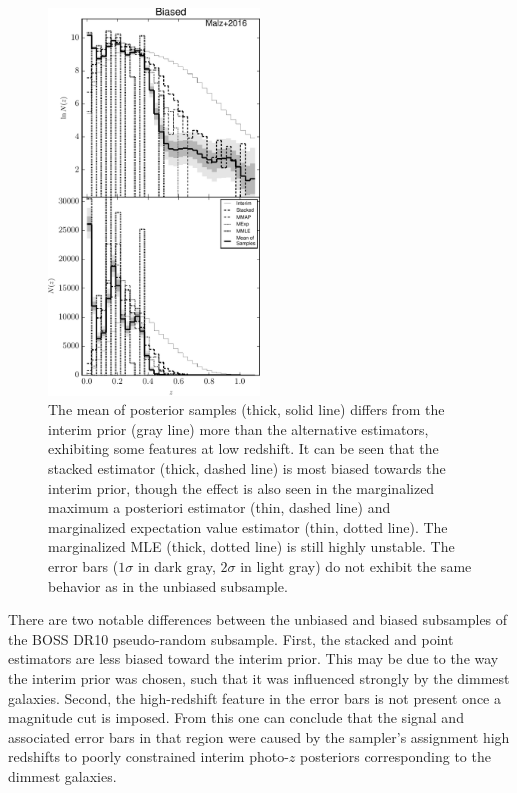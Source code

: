 \documentclass[preprint]{aastex}
\begin{document}
\begin{figure}
\includegraphics[width=0.5\textwidth]{figs/bias/comps.pdf}
\caption{The mean of posterior samples (thick, solid line) differs from the 
interim prior (gray line) more than the alternative estimators, exhibiting some 
features at low redshift.  It can be seen that the stacked estimator (thick, 
dashed line) is most biased towards the interim prior, though the effect is 
also seen in the marginalized maximum a posteriori estimator (thin, dashed 
line) and marginalized expectation value estimator (thin, dotted line).  The 
marginalized MLE (thick, dotted line) is still highly unstable.  The error bars 
($1\sigma$ in dark gray, $2\sigma$ in light gray) do not exhibit the same 
behavior as in the unbiased subsample.}
\label{fig:biascomp}
\end{figure}

There are two notable differences between the unbiased and biased subsamples of 
the BOSS DR10 pseudo-random subsample.  First, the stacked and point estimators 
are less biased toward the interim prior.  This may be due to the way the 
interim prior was chosen, such that it was influenced strongly by the dimmest 
galaxies.  Second, the high-redshift feature in the error bars is not present 
once a magnitude cut is imposed.  From this one can conclude that the signal 
and associated error bars in that region were caused by the sampler's 
assignment high redshifts to poorly constrained interim photo-$z$ posteriors 
corresponding to the dimmest galaxies.  
\end{document}
